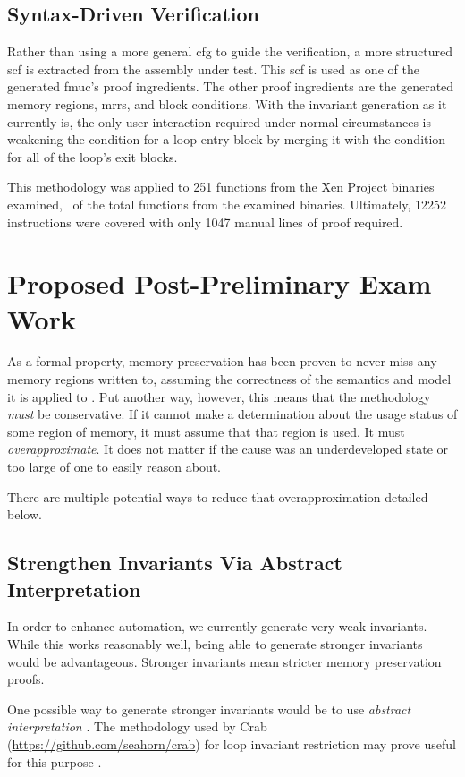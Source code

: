 \subsection{Syntax-Driven Verification}
Rather than using a more general \ac{cfg} to guide the verification,
a more structured \ac{scf} is extracted from the assembly under test.
This \ac{scf} is used as one of the generated \ac{fmuc}'s proof ingredients.
The other proof ingredients are the generated memory regions,
\acp{mrr}, and block conditions.
With the invariant generation as it currently is,
the only user interaction required under normal circumstances
is weakening the condition for a loop entry block
by merging it with the condition for all of the loop's exit blocks.

This methodology was applied to 251 functions from the Xen Project binaries examined,
\xenpercentage\ of the total functions from the examined binaries.
Ultimately, \num{12252} instructions were covered
with only \num{1047} manual lines of proof required.

\section{Proposed Post-Preliminary Exam Work}
As a formal property, memory preservation
has been proven to never miss any memory regions written to,
assuming the correctness of the semantics and model it is applied
to \autocite{bockenek2019preservation,popl2019underreview}.
Put another way, however, this means that the methodology \emph{must} be conservative.
If it cannot make a determination about the usage status of some region of memory,
it must assume that that region is used. It must \emph{overapproximate}.%
It does not matter if the cause was an underdeveloped state
or too large of one to easily reason about.

There are multiple potential ways to reduce that overapproximation detailed below.

\subsection{Strengthen Invariants Via Abstract Interpretation}
In order to enhance automation, we currently generate very weak invariants.
While this works reasonably well, being able to generate stronger invariants
would be advantageous. Stronger invariants mean stricter memory preservation proofs.

One possible way to generate stronger invariants would be to use
\emph{abstract interpretation}
\autocite{cousot1976static,cousot1977aiu}.
The methodology used by Crab (\url{https://github.com/seahorn/crab})
for loop invariant restriction may prove useful for this purpose
\autocite{gange2016abstract}.

